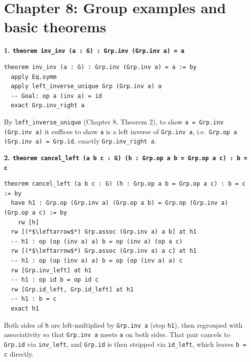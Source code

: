 \section{Chapter 8: Group examples and basic theorems}\label{sec:15-appendix-solutions:08-chapter-8:1}

\textbf{1. \texttt{theorem inv\_\allowbreak{}inv (a : G) : Grp.inv (Grp.inv a) = a}}

\begin{lstlisting}
theorem inv_inv (a : G) : Grp.inv (Grp.inv a) = a := by
  apply Eq.symm
  apply left_inverse_unique Grp (Grp.inv a) a
  -- Goal: op a (inv a) = id
  exact Grp.inv_right a
\end{lstlisting}

By \texttt{left\_\allowbreak{}inverse\_\allowbreak{}unique} (Chapter 8, Theorem 2), to show \texttt{a = Grp.inv (Grp.inv a)} it suffices to show \texttt{a} is a left inverse of \texttt{Grp.inv a}, i.e.~\texttt{Grp.op a (Grp.inv a) = Grp.id}, exactly \texttt{Grp.inv\_\allowbreak{}right a}.

\textbf{2. \texttt{theorem cancel\_\allowbreak{}left (a b c : G) (h : Grp.op a b = Grp.op a c) : b = c}}

\begin{lstlisting}
theorem cancel_left (a b c : G) (h : Grp.op a b = Grp.op a c) : b = c := by
  have h1 : Grp.op (Grp.inv a) (Grp.op a b) = Grp.op (Grp.inv a) (Grp.op a c) := by
    rw [h]
  rw [(*$\leftarrow$*) Grp.assoc (Grp.inv a) a b] at h1
  -- h1 : op (op (inv a) a) b = op (inv a) (op a c)
  rw [(*$\leftarrow$*) Grp.assoc (Grp.inv a) a c] at h1
  -- h1 : op (op (inv a) a) b = op (op (inv a) a) c
  rw [Grp.inv_left] at h1
  -- h1 : op id b = op id c
  rw [Grp.id_left, Grp.id_left] at h1
  -- h1 : b = c
  exact h1
\end{lstlisting}

Both sides of \texttt{h} are left-multiplied by \texttt{Grp.inv a} (step \texttt{h1}), then regrouped with associativity so that \texttt{Grp.inv a} meets \texttt{a} on both sides. That pair cancels to \texttt{Grp.id} via \texttt{inv\_\allowbreak{}left}, and \texttt{Grp.id} is then stripped via \texttt{id\_\allowbreak{}left}, which leaves \texttt{b = c} directly.
